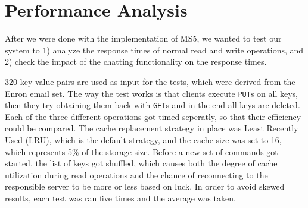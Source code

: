 \section{Performance Analysis}
\label{sec:perf}

After we were done with the implementation of MS5, we wanted to test our system to 1) analyze the response times of normal read and write operations, and 2) check the impact of the chatting functionality on the response times. 

320 key-value pairs are used as input for the tests, which were derived from the Enron email set. The way the test works is that clients execute \texttt{PUT}s on all keys, then they try obtaining them back with \texttt{GET}s and in the end all keys are deleted. Each of the three different operations got timed seperatly, so that their efficiency could be compared. The cache replacement strategy in place was Least Recently Used (LRU), which is the default strategy, and the cache size was set to 16, which represents 5\% of the storage size. Before a new set of commands got started, the list of keys got shuffled, which causes both the degree of cache utilization during read operations and the chance of reconnecting to the responsible server to be more or less based on luck.
In order to avoid skewed results, each test was ran five times and the average was taken.

